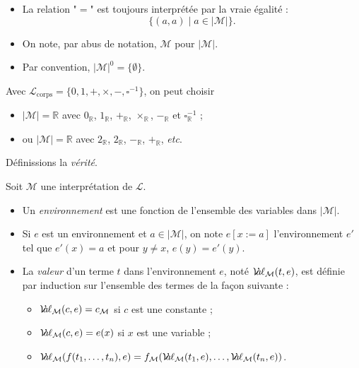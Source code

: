 \documentclass[./main]{subfiles}
\begin{document}
  \begin{rmk}
    \begin{itemize}
      \item La relation "$=$" est toujours interprétée par la vraie égalité :
        \[
        \{(a,a)  \mid a \in |\mathcal{M}|\} 
        .\]
      \item On note, par abus de notation, $\mathcal{M}$ pour $|\mathcal{M}|$.
      \item Par convention, $|\mathcal{M}|^0 = \{\emptyset\}$.
    \end{itemize}
  \end{rmk}

  \begin{exm}
      Avec $\mathcal{L}_\mathrm{corps} = \{0, 1, +, \times , -, \square^{-1}\} $, on peut choisir 
      \begin{itemize}
        \item $|\mathcal{M}| = \mathds{R}$ avec $0_\mathds{R}$, $1_\mathds{R}$, $+_\mathds{R}$, $\times_\mathds{R}$, $-_\mathds{R}$ et $\square^{-1}_\mathds{R}$ ;
        \item ou $|\mathcal{M}| = \mathds{R}$ avec $2_\mathds{R}$, $2_\mathds{R}$, $-_\mathds{R}$, $+_\mathds{R}$, \textit{etc}.
      \end{itemize}
  \end{exm}

  Définissions la \textit{vérité}.

  \begin{defn}
    Soit $\mathcal{M}$ une interprétation de $\mathcal{L}$.
    \begin{itemize}
      \item Un \textit{environnement} est une fonction de l'ensemble des variables dans $|\mathcal{M}|$.
      \item Si $e$ est un environnement et $a \in |\mathcal{M}|$, on note $e[x:=a]$ l'environnement $e'$ tel que $e'(x) = a$ et pour $y \neq x$, $e(y) = e'(y)$.
      \item La \textit{valeur} d'un terme $t$ dans l'environnement $e$, noté $\mathcal{V}\hspace{-3.5pt}a\hspace{-0.5pt}\ell_\mathcal{M}(t,e)$, est définie par induction sur l'ensemble des termes de la façon suivante :
        \begin{itemize}
          \item $\mathcal{V}\hspace{-3.5pt}a\hspace{-0.5pt}\ell_\mathcal{M}(c, e) = c_\mathcal{M}$ si $c$ est une constante ;
          \item $\mathcal{V}\hspace{-3.5pt}a\hspace{-0.5pt}\ell_\mathcal{M}(c,e) = e(x)$ si $x$ est une variable ;
          \item $\mathcal{V}\hspace{-3.5pt}a\hspace{-0.5pt}\ell_\mathcal{M}(f(t_1, \mathinner{\ldotp\ldotp\ldotp}, t_n), e) = f_\mathcal{M}(\mathcal{V}\hspace{-3.5pt}a\hspace{-0.5pt}\ell_\mathcal{M}(t_1, e), \mathinner{\ldotp\ldotp\ldotp}, \mathcal{V}\hspace{-3.5pt}a\hspace{-0.5pt}\ell_\mathcal{M}(t_n, e))$.
        \end{itemize}
    \end{itemize}
  \end{defn}
\end{document}
